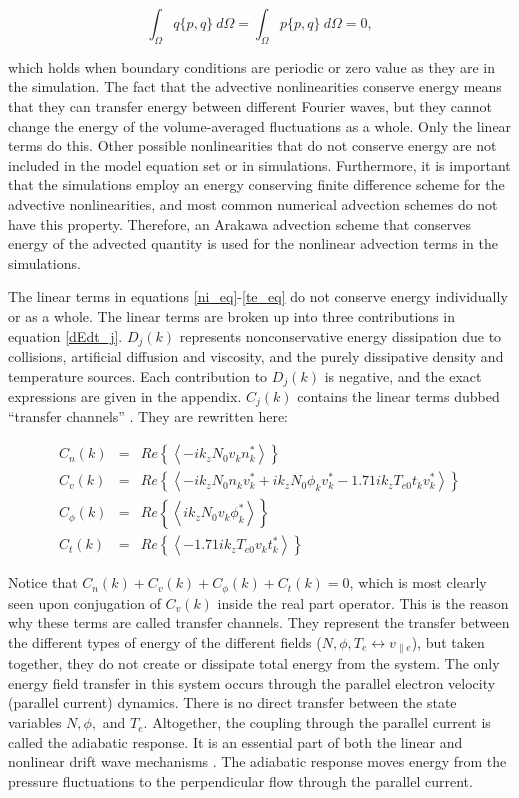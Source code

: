 \documentclass[twocolumn,showpacs,preprintnumbers,amsmath,amssymb]{revtex4}
\def\beq{\begin{equation}}
\def\eeq{\end{equation}}
\def\beqar{\begin{eqnarray}}
\def\eeqar{\end{eqnarray}}
\def\para{\parallel}
\begin{document}
\beq
\label{poisson_rln}
\int_\Omega q \{p,q\} \ d\Omega = \int_\Omega p \{p,q\} \ d\Omega = 0,
\eeq

which holds when boundary conditions are periodic or zero value as they are in the simulation. 
The fact that the advective nonlinearities conserve energy means that they can transfer energy between different Fourier waves,
but they cannot change the energy of the volume-averaged fluctuations as a whole. Only the linear terms do this.
Other possible nonlinearities that do not conserve energy are not included in the model equation set or in simulations. 
Furthermore, it is important that the simulations employ an energy conserving finite difference
scheme for the advective nonlinearities, and most common numerical advection schemes do not have this property. Therefore, an Arakawa advection scheme \cite{arakawa1966} that conserves 
energy of the advected quantity is used for the nonlinear advection terms in the simulations.

The linear terms in equations \ref{ni_eq}-\ref{te_eq} do not conserve energy individually or as a whole. The linear terms are broken up into three contributions in equation \ref{dEdt_j}.
$D_{j}(k)$ represents nonconservative energy dissipation due to collisions, artificial diffusion and viscosity, and the purely dissipative density and temperature sources.
Each contribution to $D_j(k)$ is negative, and the exact expressions are given in the appendix. 
$C_j(k)$ contains the linear terms dubbed ``transfer channels'' \cite{scott2002}. They are rewritten here:

\beqar
C_n(k) & = & Re \left\{ \left< - i k_z N_0 v_k n_k^* \right> \right\}
\label{Cnk} \\
C_v(k) & = & Re \left\{ \left< - i k_z N_0 n_k v_k^* + i k_z N_0 \phi_k v_k^*  - 1.71 i k_z T_{e0} t_k v_k^*  \right> \right\}
\label{Cvk} \\
C_\phi(k) & = & Re \left\{ \left< i k_z N_0 v_k \phi_k^* \right> \right\}
\label{Cpk} \\
C_t(k) & = & Re \left\{ \left< - 1.71 i k_z T_{e0} v_k t_k^* \right> \right\}
\label{Ctk}
\eeqar

Notice that $C_n(k) + C_v(k) + C_\phi(k) + C_t(k) = 0$, which is most clearly seen upon conjugation of $C_v(k)$ inside the real part operator.
This is the reason why these terms are called transfer channels. They represent the transfer
between the different types of energy of the different fields ($N,\phi,T_e \leftrightarrow v_{\para e}$), but taken together, they do not create or dissipate total
energy from the system. The only energy field transfer in this system occurs through the parallel electron velocity (parallel current) dynamics. There is no direct transfer between
the state variables $N, \phi,$ and $T_e$.  Altogether, the coupling through the parallel current is called the
adiabatic response. It is an essential part of both the linear and nonlinear
drift wave mechanisms \cite{scott2002,scott2005}. The adiabatic response moves energy from the pressure fluctuations to the perpendicular flow through the parallel current. \\
\end{document}
